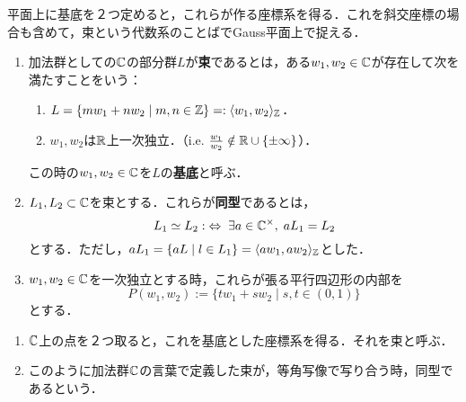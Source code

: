 \documentclass[uplatex, 12pt, dvipdfmx]{jsreport}
\begin{document}
\begin{screen}
    平面上に基底を２つ定めると，これらが作る座標系を得る．これを斜交座標の場合も含めて，束という代数系のことばでGauss平面上で捉える．
\end{screen}

\begin{definition}\mbox{}
    \begin{enumerate}
        \item 加法群としての$\mathbb{C}$の部分群$L$が\textbf{束}であるとは，ある$w_1,w_2\in\mathbb{C}$が存在して次を満たすことをいう：
        \begin{enumerate}[(1)]
            \item $L=\{mw_1+nw_2\mid m,n\in\mathbb{Z}\}=:\langle w_1,w_2\rangle_{\mathbb{Z}}$．
            \item $w_1,w_2$は$\mathbb{R}$上一次独立．（i.e. $\frac{w_1}{w_2}\notin\mathbb{R}\cup\{\pm\infty\}$）．
        \end{enumerate}
        この時の$w_1,w_2\in\mathbb{C}$を$L$の\textbf{基底}と呼ぶ．
        \item $L_1,L_2\subset\mathbb{C}$を束とする．これらが\textbf{同型}であるとは，
        \[ L_1\simeq L_2:\;\Leftrightarrow\; \exists a\in\mathbb{C}^\times,\; aL_1=L_2 \]
        とする．ただし，$aL_1=\{aL\mid l\in L_1\}=\langle aw_1,aw_2\rangle_{\mathbb{Z}}$とした．
        \item $w_1,w_2\in\mathbb{C}$を一次独立とする時，これらが張る平行四辺形の内部を
        \[ P(w_1,w_2):=\{tw_1+sw_2\mid s,t\in (0,1)\} \]
        とする．
    \end{enumerate}
\end{definition}
\begin{remark}\mbox{}
    \begin{enumerate}
        \item $\mathbb{C}$上の点を２つ取ると，これを基底とした座標系を得る．それを束と呼ぶ．
        \item このように加法群$\mathbb{C}$の言葉で定義した束が，等角写像で写り合う時，同型であるという．
    \end{enumerate}
\end{remark}
\end{document}
